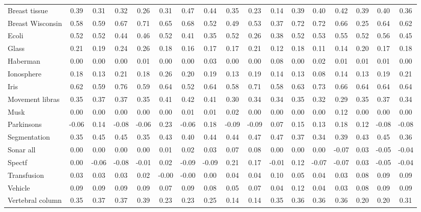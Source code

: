\documentclass[preprint,12pt]{elsarticle}
\begin{document}
\begin{landscape}
\begin{table}[h!]
{\begin{tabular}{l c ccc ccc ccc ccc ccc}
\midrule
Breast tissue & 0.39 & 0.31 & 0.32 & 0.26 & 0.31 & 0.47 & 0.44 & 0.35 & 0.23 & 0.14 & 0.39 & 0.40 & 0.42 & 0.39 & 0.40 & 0.36 \\
Breast Wisconsin & 0.58 & 0.59 & 0.67 & 0.71 & 0.65 & 0.68 & 0.52 & 0.49 & 0.53 & 0.37 & 0.72 & 0.72 & 0.66 & 0.25 & 0.64 & 0.62 \\
Ecoli & 0.52 & 0.52 & 0.44 & 0.46 & 0.52 & 0.41 & 0.35 & 0.52 & 0.26 & 0.38 & 0.52 & 0.53 & 0.55 & 0.52 & 0.56 & 0.45 \\
Glass & 0.21 & 0.19 & 0.24 & 0.26 & 0.18 & 0.16 & 0.17 & 0.17 & 0.21 & 0.12 & 0.18 & 0.11 & 0.14 & 0.20 & 0.17 & 0.18 \\
Haberman & 0.00 & 0.00 & 0.00 & 0.01 & 0.00 & 0.00 & 0.03 & 0.00 & 0.00 & 0.08 & 0.00 & 0.02 & 0.01 & 0.01 & 0.01 & 0.00 \\
Ionosphere & 0.18 & 0.13 & 0.21 & 0.18 & 0.26 & 0.20 & 0.19 & 0.13 & 0.19 & 0.14 & 0.13 & 0.08 & 0.14 & 0.13 & 0.19 & 0.21 \\
Iris & 0.62 & 0.59 & 0.76 & 0.59 & 0.64 & 0.52 & 0.64 & 0.58 & 0.71 & 0.58 & 0.63 & 0.73 & 0.66 & 0.64 & 0.64 & 0.64 \\
Movement libras & 0.35 & 0.37 & 0.37 & 0.35 & 0.41 & 0.42 & 0.41 & 0.30 & 0.34 & 0.34 & 0.35 & 0.32 & 0.29 & 0.35 & 0.37 & 0.34
\\
Musk & 0.00 & 0.00 & 0.00 & 0.00 & 0.00 & 0.01 & 0.01 & 0.02 & 0.00 & 0.00 & 0.00 & 0.00 & 0.12 & 0.00 & 0.00 & 0.00 \\
Parkinsons & -0.06 & 0.14 & -0.08 & -0.06 & 0.23 & -0.06 & 0.18 & -0.09 & -0.09 & 0.07 & 0.15 & 0.13 & 0.18 & 0.12 & -0.08 & -0.08 \\
Segmentation & 0.35 & 0.45 & 0.45 & 0.35 & 0.43 & 0.40 & 0.44 & 0.44 & 0.47 & 0.47 & 0.37 & 0.34 & 0.39 & 0.43 & 0.45 & 0.36 \\
Sonar all & 0.00 & 0.00 & 0.00 & 0.00 & 0.01 & 0.02 & 0.03 & 0.07 & 0.08 & 0.00 & 0.00 & 0.00 & -0.07 & 0.03 & -0.05 & -0.04 \\
Spectf & 0.00 & -0.06 & -0.08 & -0.01 & 0.02 & -0.09 & -0.09 & 0.21 & 0.17 & -0.01 & 0.12 & -0.07 & -0.07 & 0.03 & -0.05 & -0.04 \\
Transfusion & 0.03 & 0.03 & 0.03 & 0.02 & -0.00 & -0.00 & 0.00 & 0.04 & 0.04 & 0.10 & 0.05 & 0.04 & 0.03 & 0.08 & 0.09 & 0.09 \\
Vehicle & 0.09 & 0.09 & 0.09 & 0.09 & 0.07 & 0.09 & 0.08 & 0.05 & 0.07 & 0.04 & 0.12 & 0.04 & 0.03 & 0.08 & 0.09 & 0.09 \\
Vertebral column & 0.35 & 0.37 & 0.37 & 0.39 & 0.23 & 0.23 & 0.25 & 0.14 & 0.14 & 0.35 & 0.36 & 0.36 & 0.36 & 0.20 & 0.20 & 0.31 \\

\end{tabular}}
\end{table}
\end{landscape}
\end{document}

